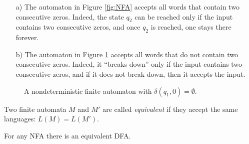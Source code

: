 \begin{page}
\setcounter{section}{1}
\setcounter{subsection}{3}
\setcounter{dfn}{7}
\label{portion:1035}

\begin{exl}
\label{exl:NFA}
\par\noindent
\begin{enumerate}
\item[a)]
The automaton in Figure \ref{fig:NFA} accepts all words that contain two consecutive zeros.
Indeed, the state $q_2$ can be reached only if the input contains two consecutive zeros,
and once $q_2$ is reached, one stays there forever.
\item[b)]
The automaton in Figure \ref{fig:NFABroken} accepts all words that do not contain two consecutive zeros.
Indeed, it ``breaks down'' only if the input contains two consecutive zeros, and if it does not break down, then it accepts the input.
\end{enumerate}
\end{exl}

\end{page}

\begin{page}
\setcounter{section}{1}
\setcounter{subsection}{3}
\setcounter{dfn}{7}
\label{portion:1036}


\begin{figure}[htb]
\begin{center}

\end{center}
\caption{A nondeterministic finite automaton with $\delta(q_1, 0) = \emptyset$.}
\label{fig:NFABroken}
\end{figure}



\end{page}

\begin{page}
\setcounter{section}{1}
\setcounter{subsection}{3}
\setcounter{dfn}{8}
\label{portion:1038}

\begin{dfn}
Two finite automata $M$ and $M'$ are called \emph{equivalent} if they accept the same languages: $L(M) = L(M')$.
\end{dfn}

\end{page}

\begin{page}
\setcounter{section}{1}
\setcounter{subsection}{3}
\setcounter{dfn}{9}
\label{portion:1041}

\begin{thm}
For any NFA there is an equivalent DFA.
\end{thm}

\end{page}

